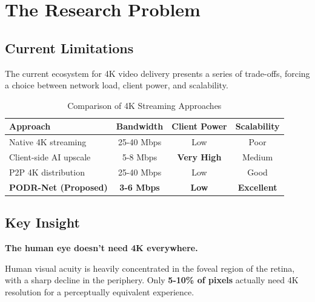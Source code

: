 \documentclass[11pt, a4paper]{article}
\begin{document}
\vspace{1cm}

\tableofcontents
\clearpage

\section{The Research Problem}

\subsection{Current Limitations}

The current ecosystem for 4K video delivery presents a series of trade-offs, forcing a choice between network load, client power, and scalability.

\begin{table}[H]
\centering
\caption{Comparison of 4K Streaming Approaches}
\label{tab:limitations}
\begin{tabular}{>{\raggedright}p{4cm} c c c}
\toprule
\textbf{Approach} & \textbf{Bandwidth} & \textbf{Client Power} & \textbf{Scalability} \\
\midrule
\rowcolor{lightbg} Native 4K streaming & 25-40 Mbps & Low & Poor \\
Client-side AI upscale & 5-8 Mbps & \textcolor{warningred}{\textbf{Very High}} & Medium \\
\rowcolor{lightbg} P2P 4K distribution & 25-40 Mbps & Low & Good \\
\midrule
\rowcolor{secondarygreen!15} \textbf{PODR-Net (Proposed)} & \textcolor{secondarygreen}{\textbf{3-6 Mbps}} & \textcolor{secondarygreen}{\textbf{Low}} & \textcolor{secondarygreen}{\textbf{Excellent}} \\
\bottomrule
\end{tabular}
\end{table}

\subsection{Key Insight}

\begin{keyinsight}
\textbf{The human eye doesn't need 4K everywhere.}

Human visual acuity is heavily concentrated in the foveal region of the retina, with a sharp decline in the periphery. Only \textbf{5-10\% of pixels} actually need 4K resolution for a perceptually equivalent experience.
\end{keyinsight}
\end{document}
